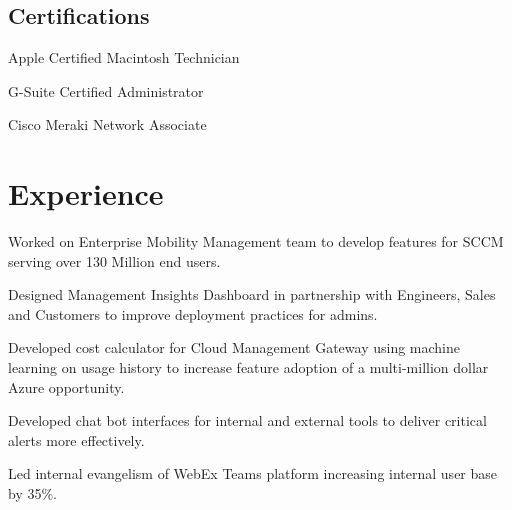 \documentclass[]{deedy-resume-openfont}
\begin{document}
\begin{minipage}[t]{0.33\textwidth}
\subsection{Certifications}
\vspace{\topsep}
\begin{tightemize}
\item Apple Certified Macintosh Technician
\item G-Suite Certified Administrator
\item Cisco Meraki Network Associate
\end{tightemize}


%
%

\end{minipage} 
\hfill
\begin{minipage}[t]{0.66\textwidth} 


\section{Experience}

\vspace{\topsep} %
\begin{tightemize}
\item Worked on Enterprise Mobility Management team to develop features for SCCM serving over 130 Million end users.
\item Designed Management Insights Dashboard in partnership with Engineers, Sales and Customers to improve deployment practices for admins.
\item Developed cost calculator for Cloud Management Gateway using machine learning on usage history to increase feature adoption of a multi-million dollar Azure opportunity.
\end{tightemize}
\sectionsep

\vspace{\topsep} %
\begin{tightemize}
\item Developed chat bot interfaces for internal and external tools to deliver critical alerts more effectively.
\item Led internal evangelism of WebEx Teams platform increasing internal user base by 35\%.
\end{tightemize}
\sectionsep


\end{minipage}
\end{document}
